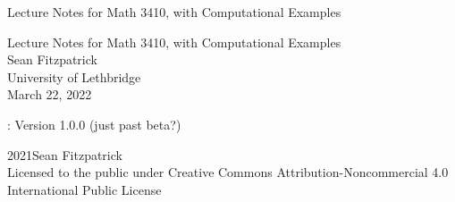 \documentclass[oneside,10pt,]{book}
\newcommand{\titlepagefont}{\relax}
\numberwithin{equation}{section}
\begin{document}
\raggedbottom
\frontmatter
\thispagestyle{empty}
{\titlepagefont\centering
\vspace*{0.28\textheight}
{\Huge Lecture Notes for Math 3410, with Computational Examples}\\}
\clearpage
\thispagestyle{empty}
{\titlepagefont\centering
\vspace*{0.14\textheight}
{\Huge Lecture Notes for Math 3410, with Computational Examples}\\[3\baselineskip]
{\Large Sean Fitzpatrick}\\[0.5\baselineskip]
{\Large University of Lethbridge}\\[3\baselineskip]
{\Large March 22, 2022}\\}
\clearpage
\thispagestyle{empty}
\hypertarget{g:colophon:idp1}{}
: Version 1.0.0 (just past beta?)\par\medskip
\noindent\textcopyright{}2021\quad{}Sean Fitzpatrick\\[0.5\baselineskip]
Licensed to the public under Creative Commons Attribution-Noncommercial 4.0 International Public License\par\medskip
{}
\null\clearpage
%
%
\typeout{************************************************}
\typeout{************************************************}
%
\end{document}
